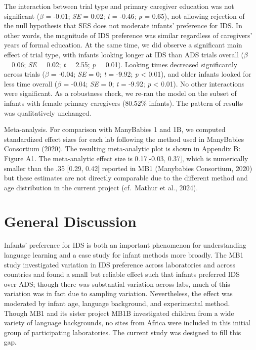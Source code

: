 \documentclass[
  ,man,floatsintext]{apa6}
\begin{document}
The interaction between trial type and primary caregiver education was not significant (\emph{\(\beta\)} = -0.01; \emph{SE} = 0.02; \emph{t} = -0.46; \emph{p} = 0.65), not allowing rejection of the null hypothesis that SES does not moderate infants' preference for IDS. In other words, the magnitude of IDS preference was similar regardless of caregivers' years of formal education. At the same time, we did observe a significant main effect of trial type, with infants looking longer at IDS than ADS trials overall (\emph{\(\beta\)} = 0.06; \emph{SE} = 0.02; \emph{t} = 2.55; \emph{p} = 0.01). Looking times decreased significantly across trials (\emph{\(\beta\)} = -0.04; \emph{SE} = 0; \emph{t} = -9.92; \emph{p} \textless{} 0.01), and older infants looked for less time overall (\emph{\(\beta\)} = -0.04; \emph{SE} = 0; \emph{t} = -9.92; \emph{p} \textless{} 0.01). No other interactions were significant. As a robustness check, we re-ran the model on the subset of infants with female primary caregivers (80.52\% infants). The pattern of results was qualitatively unchanged.

Meta-analysis. For comparison with ManyBabies 1 and 1B, we computed standardized effect sizes for each lab following the method used in ManyBabies Consortium (2020). The resulting meta-analytic plot is shown in Appendix B: Figure A1. The meta-analytic effect size is 0.17{[}-0.03, 0.37{]}, which is numerically smaller than the .35 {[}0.29, 0.42{]} reported in MB1 (Manybabies Consortium, 2020) but these estimates are not directly comparable due to the different method and age distribution in the current project (cf.~Mathur et al., 2024).

\hypertarget{general-discussion}{%
\section{General Discussion}\label{general-discussion}}

Infants' preference for IDS is both an important phenomenon for understanding language learning and a case study for infant methods more broadly. The MB1 study investigated variation in IDS preference across laboratories and across countries and found a small but reliable effect such that infants preferred IDS over ADS; though there was substantial variation across labs, much of this variation was in fact due to sampling variation. Nevertheless, the effect was moderated by infant age, language background, and experimental method. Though MB1 and its sister project MB1B investigated children from a wide variety of language backgrounds, no sites from Africa were included in this initial group of participating laboratories. The current study was designed to fill this gap.
\end{document}
